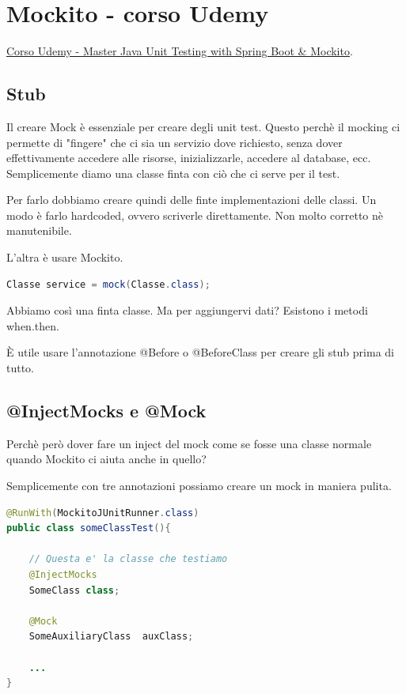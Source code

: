 \documentclass[11pt,a4paper]{book}
\begin{document}
\chapter{Mockito - corso Udemy}
\href{https://www.udemy.com/course/learn-unit-testing-with-spring-boot/}{Corso Udemy - Master Java Unit Testing with Spring Boot \& Mockito}.


\section{Stub}
Il creare Mock è essenziale per creare degli unit test. Questo perchè il mocking ci permette di "fingere" che ci sia un servizio dove richiesto, senza dover effettivamente accedere alle risorse, inizializzarle, accedere al database, ecc. Semplicemente diamo una classe finta con ciò che ci serve per il test.

Per farlo dobbiamo creare quindi delle finte implementazioni delle classi. Un modo è farlo hardcoded, ovvero scriverle direttamente. Non molto corretto nè manutenibile.

L'altra è usare Mockito.
\begin{center}
	\begin{lstlisting}[language = Java]
Classe service = mock(Classe.class);
	\end{lstlisting}
\end{center}

Abbiamo così una finta classe. Ma per aggiungervi dati?
Esistono i metodi when.then. \pageref{par: whenthen}

È utile usare l'annotazione @Before o @BeforeClass per creare gli stub prima di tutto.

\section{@InjectMocks e @Mock}
Perchè però dover fare un inject del mock come se fosse una classe normale quando Mockito ci aiuta anche in quello?

Semplicemente con tre annotazioni possiamo creare un mock in maniera pulita.

\begin{lstlisting}[language = Java]
@RunWith(MockitoJUnitRunner.class)
public class someClassTest(){
	
	// Questa e' la classe che testiamo
	@InjectMocks
	SomeClass class;
	
	@Mock
	SomeAuxiliaryClass	auxClass;
	
	...
}
\end{lstlisting}
\end{document}
